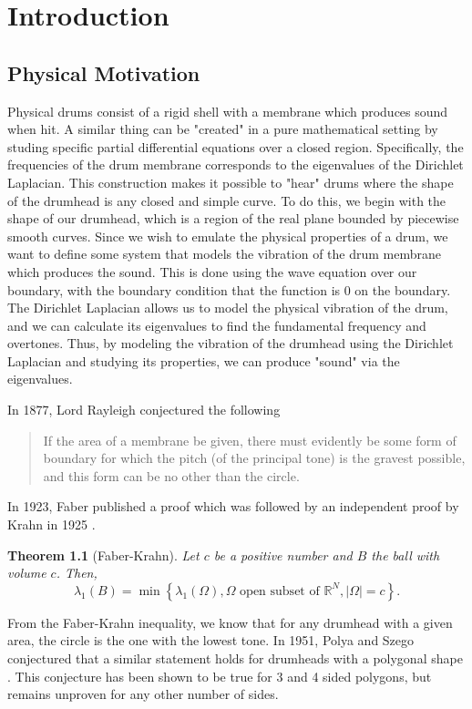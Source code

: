 \documentclass[12pt]{report}
\newtheorem{theorem}{Theorem}[section]
\numberwithin{definition}{section}
\begin{document}
\chapter{Introduction}

\break
\section {Physical Motivation}


Physical drums consist of a rigid shell with a membrane which produces sound when hit.
A similar thing can be "created" in a pure mathematical setting by studing specific partial differential equations over a closed region.
Specifically, the frequencies of the drum membrane corresponds to the eigenvalues of the Dirichlet Laplacian.
This construction makes it possible to "hear" drums where the shape of the drumhead is any closed and simple curve.
To do this, we begin with the shape of our drumhead, which is a region of the real plane bounded by piecewise smooth curves.
Since we wish to emulate the physical properties of a drum, we want to define some system that models the vibration of the drum membrane which produces the sound.
This is done using the wave equation over our boundary, with the boundary condition that the function is 0 on the boundary.
The Dirichlet Laplacian allows us to model the physical vibration of the drum, and we can calculate its eigenvalues to find the fundamental frequency and overtones.
Thus, by modeling the vibration of the drumhead using the Dirichlet Laplacian and studying its properties, we can produce "sound" via the eigenvalues.

In 1877, Lord Rayleigh conjectured the following \cite{rayleigh}

\begin{quote}
If the area of a membrane be given, there must evidently be some
form of boundary for which the pitch (of the principal tone) is the
gravest possible, and this form can be no other than the circle.
\end{quote}

In 1923, Faber published a proof which was followed by an independent proof by Krahn in 1925 \cite{krahn}.
\begin{theorem}[Faber-Krahn]
 Let $c$ be a positive number and $B$ the ball with volume $c$. Then,
 \[
   \lambda_{1}(B) = \min \left\{ \lambda_{1}(\Omega), \Omega \text{ open subset of } \mathbb{R}^{N}, |\Omega| = c \right\} 
 .\] 
\end{theorem}
From the Faber-Krahn inequality, we know that for any drumhead with a given area, the circle is the one with the lowest tone.
In 1951, Polya and Szego conjectured that a similar statement holds for drumheads with a polygonal shape \cite{henrot}.
This conjecture has been shown to be true for 3 and 4 sided polygons, but remains unproven for any other number of sides.
\end{document}
